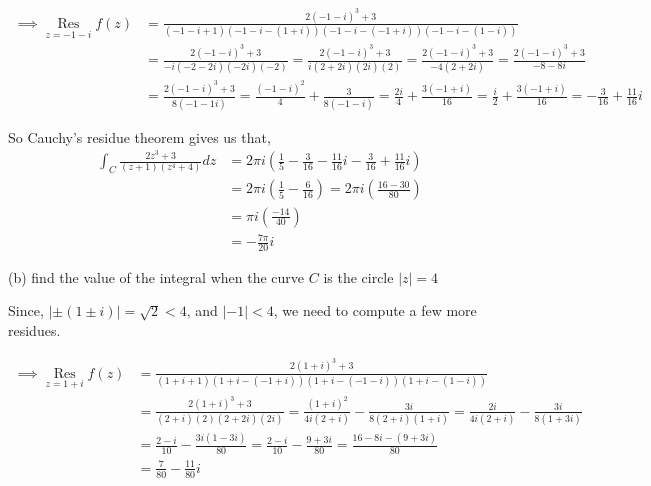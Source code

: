 \documentclass{article}
\def\res{\mathop{\text{Res}}\limits}
\begin{document}
\begin{align*}\implies \res_{z=-1-i} f(z)
  &= \frac{2(-1-i)^3+3}{(-1-i+1)(-1-i-(1+i))(-1-i-(-1+i))(-1-i-(1-i))}\\
  &=\frac{2(-1-i)^3+3}{-i(-2-2i)(-2i)(-2)}
    =\frac{2(-1-i)^3+3}{i(2+2i)(2i)(2)}
    =\frac{2(-1-i)^3+3}{-4(2+2i)}
    =\frac{2(-1-i)^3+3}{-8-8i}\\
  &=\frac{2(-1-i)^3+3}{8(-1-1i)} =\frac{(-1-i)^2}{4}
    +\frac{3}{8(-1-i)} = \frac{2i}{4}
    +\frac{3(-1+i)}{16}  = \frac{i}{2}
    +\frac{3(-1+i)}{16} = -\frac{3}{16}+ \frac{11}{16}i
\end{align*}

So Cauchy's residue theorem gives us that,
 \begin{align*}\int_C
  \frac{2z^3+3}{(z+1)(z^4 +4)} dz &= 2\pi i\left( \frac{1}{5}
    -\frac{3}{16} - \frac{11}{16}i -\frac{3}{16} + \frac{11}{16}i \right)\\&= 2\pi i\left( \frac{1}{5}
    -\frac{6}{16} \right) = 2\pi i\left( \frac{16-30}{80} \right)\\ &=
  \pi i\left( \frac{-14}{40} \right)\\ &= -\frac{7\pi}{20}i\end{align*}

(b) find the value of the integral when the curve $C$ is the circle
$|z|=4$

Since, $|\pm(1\pm i)| = \sqrt{2} < 4$, and $|-1|<4$, we need to
compute a few more residues.

\begin{align*}\implies \res_{z=1+i} f(z)
  &=  \frac{2(1+i)^3+3}{(1+i+1)(1+i-(-1+i))(1+i-(-1-i))(1+i-(1-i))}\\
  &=  \frac{2(1+i)^3+3}{(2+i)(2)(2+2i)(2i)} =
    \frac{(1+i)^2}{4i(2+i)}-\frac{3i}{8(2+i)(1+i)} =
    \frac{2i}{4i(2+i)}-\frac{3i}{8(1+3i)}\\&=
    \frac{2-i}{10}-\frac{3i(1-3i)}{80}
  =  \frac{2-i}{10}-\frac{9+3i}{80} =  \frac{16-8i-(9+3i)}{80}\\ &=
  \frac{7}{80}-\frac{11}{80}i
\end{align*}
\end{document}
